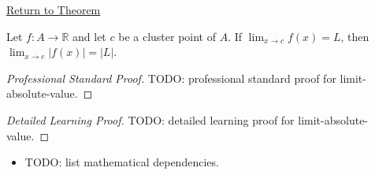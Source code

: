 \newpage
{}
\label{prf:limit-absolute-value}

\begin{remark*}[Return]
\hyperref[prop:limit-absolute-value]{Return to Theorem}
\end{remark*}

\begin{proposition*}
Let $f : A \to \mathbb{R}$ and let $c$ be a cluster point of $A$.
If $\lim_{x\to c}f(x)=L$, then
$\lim_{x\to c}|f(x)|=|L|$.

\smallskip\noindent
\end{proposition*}

\begin{proof}[Professional Standard Proof]
\LRAProofBodyStart
TODO: professional standard proof for limit-absolute-value.
\end{proof}

\begin{proof}[Detailed Learning Proof]
\LRAProofBodyStart
TODO: detailed learning proof for limit-absolute-value.
\end{proof}

\begin{remark*}
\end{remark*}

\begin{dependencies}
\begin{itemize}
  \item TODO: list mathematical dependencies.
\end{itemize}
\end{dependencies}

\clearpage
